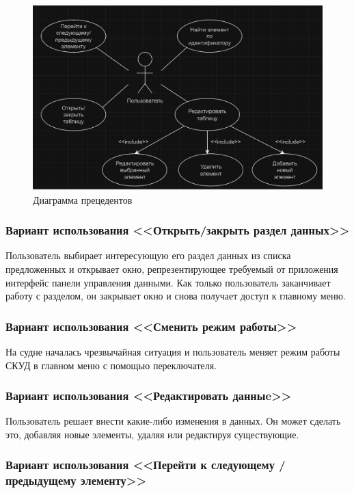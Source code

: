 \begin{figure}[ht]
	\centering
	\includegraphics[width=1.0\linewidth]{images/CommonScheme2}
	\caption{Диаграмма прецедентов}
	\label{fig:commonscheme2}
\end{figure}

\subsubsection{Вариант использования <<Открыть/закрыть раздел данных>>}

Пользователь выбирает интересующую его раздел данных из списка предложенных и открывает окно, репрезентирующее требуемый от приложения интерфейс панели управления данными. Как только пользователь заканчивает работу с разделом, он закрывает окно и снова получает доступ к главному меню.
\subsubsection{Вариант использования <<Сменить режим работы>>}

На судне началась чрезвычайная ситуация и пользователь меняет режим работы СКУД в главном меню с помощью переключателя.

\subsubsection{Вариант использования <<Редактировать данныe>>}

Пользователь решает внести какие-либо изменения в данных. Он может сделать это, добавляя новые элементы, удаляя или редактируя существующие.

\subsubsection{Вариант использования <<Перейти к следующему / предыдущему элементу>>}

